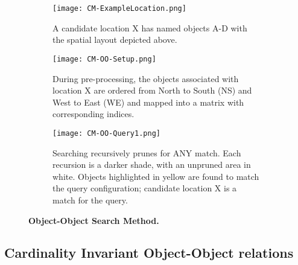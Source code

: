 \begin{figure*}[h]
    \centering
    \begin{subfigure}[t]{.25\textwidth}
        \texttt{[image: CM-ExampleLocation.png]}
        \caption{\small A candidate location X has named objects A-D with the spatial layout depicted above.}
        \label{fig:CM-Example}
    \end{subfigure}
    \hfill
    \begin{subfigure}[t]{.25\textwidth}
        \texttt{[image: CM-OO-Setup.png]}
        \caption{\small During pre-processing, the objects associated with location X are ordered from North to South (NS) and West to East (WE) and mapped into a matrix with corresponding indices.}
        \label{fig:CM-OO-Setup}
    \end{subfigure}
    \hfill
        \begin{subfigure}[t]{.25\textwidth}
        \texttt{[image: CM-OO-Query1.png]}
        \caption{\small Searching recursively prunes for ANY match. Each recursion is a darker shade, with an unpruned area in white. Objects highlighted in yellow are found to match the query configuration; candidate location X is a match for the query.}
        \label{fig:CM-OO-Query}
    \hfill
    \end{subfigure}
    \caption{\textbf{Object-Object Search Method. }}\label{figure:ConceptMap} 
\end{figure*}

\subsection{Cardinality Invariant Object-Object relations}










